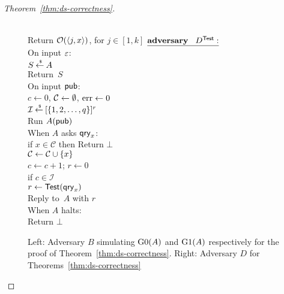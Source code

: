 \begin{proof}[Theorem~\ref{thm:ds-correctness}]
\begin{figure}
{{\medskip
{}\\
\nudge Return ${\cal O}(\langle j,x \rangle)$, for $j\in[1,k]$
}
{
${\underline{\textbf{adversary}\hspace*{2ex} {D^{\mathsf{Test}}}:}}$\\[4pt]
On input $\varepsilon$:\\
\nudge $S {\:\stackrel{{\scriptscriptstyle \hspace{0.2em}\$}} {\leftarrow}\:} A$\\
\nudge Return~$S$\\
On input ${\sf pub}$:\\
\nudge $c \gets 0$, ${\cal C} \gets \emptyset$, $\mathrm{err} \gets 0$\\
\nudge $\mathcal{I}{\:\stackrel{{\scriptscriptstyle \hspace{0.2em}\$}} {\leftarrow}\:} [\{1,2,\ldots,q\}]^r$\\
\nudge Run $A({\sf pub})$\\
\nudge When $A$ asks $\mathsf{qry}_x$:\\
\nudge\nudge if $x \in \mathcal{C}$ then Return $\bot$\\
\nudge\nudge ${\cal C} \gets {\cal C} \cup \{x\}$\\
\nudge\nudge $c \gets c+1$; $r \gets 0$\\
\nudge\nudge if $c \in \mathcal{I}$\\
\nudge\nudge \nudge $r \gets \mathsf{Test}(\mathsf{qry}_x)$\\
\nudge\nudge Reply to~$A$ with $r$\\
\nudge When $A$ halts:\\
\nudge\nudge Return $\bot$
}
}
\caption{Left: Adversary $B$ simulating $\text{G0}(A)$ and $\text{G1}(A)$ respectively for the
proof of Theorem~\ref{thm:ds-correctness}. Right: Adversary $D$ for Theorems~\ref{thm:ds-correctness} }\label{fig:ds-correctness-adv}\label{fig:lin-correctness-zq-adv}
\end{figure}	

\end{proof}
